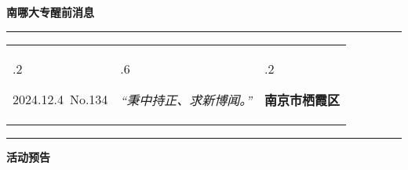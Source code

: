 \documentclass[letterpaper, 12pt]{article}
\begin{document}
\begin{center}
    \Huge\textbf{南哪大专醒前消息}
\end{center}
\vspace{4mm}
\hrule
\renewcommand\tabularxcolumn[1]{m{#1}}
\begin{tabularx}{\textwidth}{>{\hsize.2\hsize}X>{\hsize.6\hsize}X>{\hsize.2\hsize}X}
    \begin{flushleft}
        2024.12.4\, No.134
    \end{flushleft}
    &
    \begin{center}
        \textit{“秉中持正、求新博闻。”}
    \end{center}
    &
    \begin{flushright}
        \textbf{南京市栖霞区}
    \end{flushright}
\end{tabularx}
\vspace{-3.5mm}
\hrule
\vspace{4mm}
\centerline{\huge\textbf{活动预告}}
\end{document}
